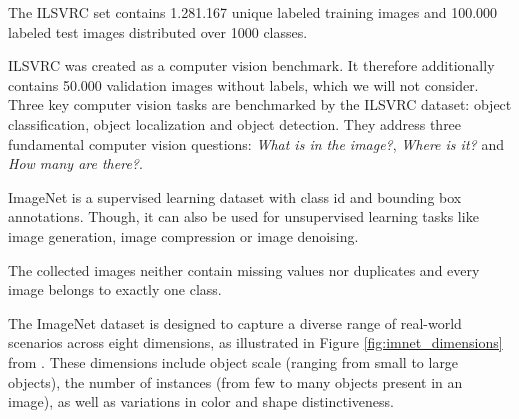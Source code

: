     The ILSVRC set contains 1.281.167 unique labeled training images and 100.000 labeled test images distributed over 1000 classes.

    ILSVRC was created as a computer vision benchmark. It therefore additionally contains 50.000 validation images without labels, which we will not consider.
    Three key computer vision tasks are benchmarked by the ILSVRC dataset: object classification, object localization and object detection.
    They address three fundamental computer vision questions: \textit{What is in the image?}, \textit{Where is it?} and \textit{How many are there?}.

    ImageNet is a supervised learning dataset with class id and bounding box annotations. Though, it can also be used for unsupervised learning tasks like image generation, image compression or image denoising.

    The collected images neither contain missing values nor duplicates and every image belongs to exactly one class.

    The ImageNet dataset is designed to capture a diverse range of real-world scenarios across eight dimensions, as illustrated in Figure \ref{fig:imnet_dimensions} from \cite{imagenet_breakdown}. These dimensions include object scale (ranging from small to large objects), the number of instances (from few to many objects present in an image), as well as variations in color and shape distinctiveness.

